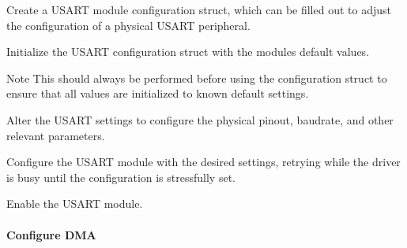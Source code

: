 \begin{DoxyEnumerate}
\item Create a U\+S\+A\+RT module configuration struct, which can be filled out to adjust the configuration of a physical U\+S\+A\+RT peripheral. 
\begin{DoxyCodeInclude}{0}
\end{DoxyCodeInclude}

\item Initialize the U\+S\+A\+RT configuration struct with the module\textquotesingle{}s default values. 
\begin{DoxyCodeInclude}{0}
\end{DoxyCodeInclude}
 \begin{DoxyNote}{Note}
This should always be performed before using the configuration struct to ensure that all values are initialized to known default settings.
\end{DoxyNote}

\item Alter the U\+S\+A\+RT settings to configure the physical pinout, baudrate, and other relevant parameters. 
\begin{DoxyCodeInclude}{0}
\end{DoxyCodeInclude}

\item Configure the U\+S\+A\+RT module with the desired settings, retrying while the driver is busy until the configuration is stressfully set. 
\begin{DoxyCodeInclude}{0}
\end{DoxyCodeInclude}

\item Enable the U\+S\+A\+RT module. 
\begin{DoxyCodeInclude}{0}
\end{DoxyCodeInclude}
 
\end{DoxyEnumerate}\hypertarget{asfdoc_sam0_sercom_usart_dma_use_case_asfdoc_sam0_usart_dma_use_case_setup_flow_dma}{}\paragraph{Configure D\+MA}\label{asfdoc_sam0_sercom_usart_dma_use_case_asfdoc_sam0_usart_dma_use_case_setup_flow_dma}


